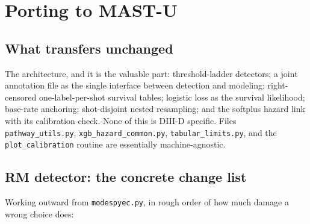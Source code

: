 \documentclass[11pt,a4paper]{article}
\newcommand{\code}[1]{\texttt{\small #1}}
\begin{document}
\section{Porting to MAST-U}
\label{sec:mastu}

\subsection{What transfers unchanged}

The architecture, and it is the valuable part: threshold-ladder detectors; a joint annotation file
as the single interface between detection and modeling; right-censored one-label-per-shot survival
tables; logistic loss as the survival likelihood; base-rate anchoring; shot-disjoint nested
resampling; and the softplus hazard link with its calibration check. None of this is DIII-D
specific. Files \code{pathway\_utils.py}, \code{xgb\_hazard\_common.py}, \code{tabular\_limits.py},
and the \code{plot\_calibration} routine are essentially machine-agnostic.

\subsection{RM detector: the concrete change list}

Working outward from \code{modespyec.py}, in rough order of how much damage a wrong choice does:
\end{document}

